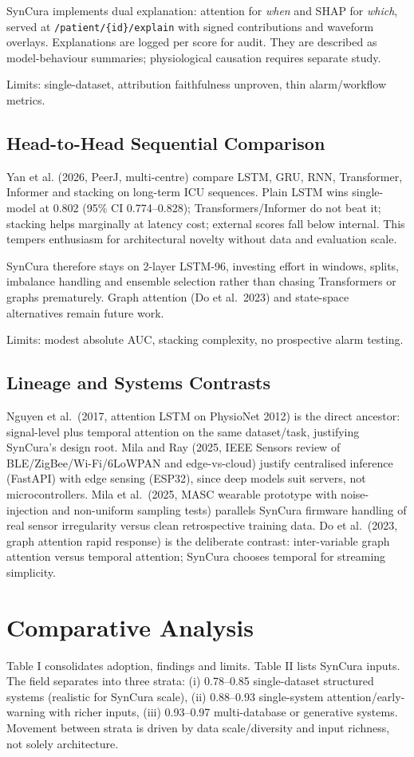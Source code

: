 \documentclass[a4paper,conference]{IEEEtran}
\begin{document}
SynCura implements dual explanation: attention for {\em when} and SHAP for {\em which}, served at {\tt /patient/\{id\}/explain} with signed contributions and waveform overlays. Explanations are logged per score for audit. They are described as model-behaviour summaries; physiological causation requires separate study.

Limits: single-dataset, attribution faithfulness unproven, thin alarm/workflow metrics.

\subsection{Head-to-Head Sequential Comparison}
Yan et al. (2026, PeerJ, multi-centre) compare LSTM, GRU, RNN, Transformer, Informer and stacking on long-term ICU sequences. Plain LSTM wins single-model at 0.802 (95\% CI 0.774--0.828); Transformers/Informer do not beat it; stacking helps marginally at latency cost; external scores fall below internal. This tempers enthusiasm for architectural novelty without data and evaluation scale.

SynCura therefore stays on 2-layer LSTM-96, investing effort in windows, splits, imbalance handling and ensemble selection rather than chasing Transformers or graphs prematurely. Graph attention (Do et al.\ 2023) and state-space alternatives remain future work.

Limits: modest absolute AUC, stacking complexity, no prospective alarm testing.

\subsection{Lineage and Systems Contrasts}
Nguyen et al.\ (2017, attention LSTM on PhysioNet 2012) is the direct ancestor: signal-level plus temporal attention on the same dataset/task, justifying SynCura's design root. Mila and Ray (2025, IEEE Sensors review of BLE/ZigBee/Wi-Fi/6LoWPAN and edge-vs-cloud) justify centralised inference (FastAPI) with edge sensing (ESP32), since deep models suit servers, not microcontrollers. Mila et al.\ (2025, MASC wearable prototype with noise-injection and non-uniform sampling tests) parallels SynCura firmware handling of real sensor irregularity versus clean retrospective training data. Do et al.\ (2023, graph attention rapid response) is the deliberate contrast: inter-variable graph attention versus temporal attention; SynCura chooses temporal for streaming simplicity.

\section{Comparative Analysis}
Table I consolidates adoption, findings and limits. Table II lists SynCura inputs. The field separates into three strata: (i) 0.78--0.85 single-dataset structured systems (realistic for SynCura scale), (ii) 0.88--0.93 single-system attention/early-warning with richer inputs, (iii) 0.93--0.97 multi-database or generative systems. Movement between strata is driven by data scale/diversity and input richness, not solely architecture.
\end{document}
